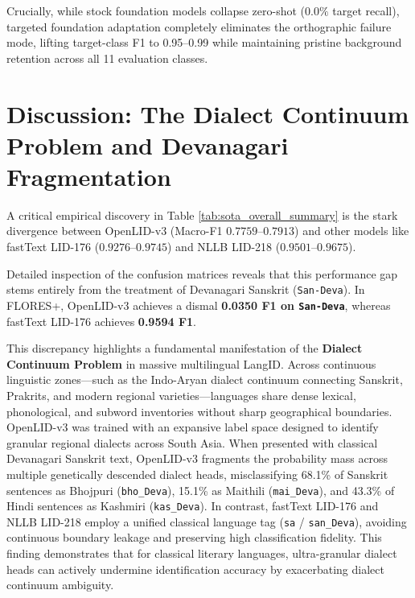 \documentclass[11pt]{article}
\begin{document}
Crucially, while stock foundation models collapse zero-shot ($0.0\%$ target recall), targeted foundation adaptation completely eliminates the orthographic failure mode, lifting target-class F1 to 0.95--0.99 while maintaining pristine background retention across all 11 evaluation classes.

\FloatBarrier
\section{Discussion: The Dialect Continuum Problem and Devanagari Fragmentation}

A critical empirical discovery in Table \ref{tab:sota_overall_summary} is the stark divergence between OpenLID-v3 (Macro-F1 $0.7759$--$0.7913$) and other models like fastText LID-176 ($0.9276$--$0.9745$) and NLLB LID-218 ($0.9501$--$0.9675$).

Detailed inspection of the confusion matrices reveals that this performance gap stems entirely from the treatment of Devanagari Sanskrit (\texttt{San-Deva}). In FLORES+, OpenLID-v3 achieves a dismal \textbf{0.0350 F1 on \texttt{San-Deva}}, whereas fastText LID-176 achieves \textbf{0.9594 F1}.

This discrepancy highlights a fundamental manifestation of the \textbf{Dialect Continuum Problem} in massive multilingual LangID. Across continuous linguistic zones—such as the Indo-Aryan dialect continuum connecting Sanskrit, Prakrits, and modern regional varieties—languages share dense lexical, phonological, and subword inventories without sharp geographical boundaries. OpenLID-v3 was trained with an expansive label space designed to identify granular regional dialects across South Asia. When presented with classical Devanagari Sanskrit text, OpenLID-v3 fragments the probability mass across multiple genetically descended dialect heads, misclassifying 68.1\% of Sanskrit sentences as Bhojpuri (\texttt{bho\_Deva}), 15.1\% as Maithili (\texttt{mai\_Deva}), and 43.3\% of Hindi sentences as Kashmiri (\texttt{kas\_Deva}). In contrast, fastText LID-176 and NLLB LID-218 employ a unified classical language tag (\texttt{sa} / \texttt{san\_Deva}), avoiding continuous boundary leakage and preserving high classification fidelity. This finding demonstrates that for classical literary languages, ultra-granular dialect heads can actively undermine identification accuracy by exacerbating dialect continuum ambiguity.
\end{document}
